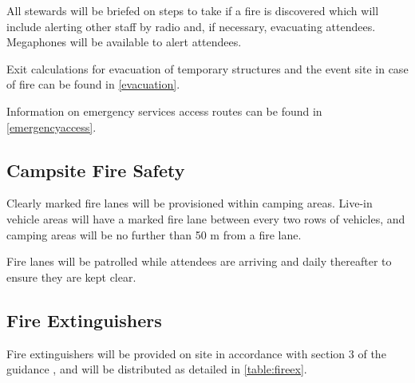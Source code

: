 All stewards will be briefed on steps to take if a fire is discovered which
will include alerting other staff by radio and, if necessary, evacuating
attendees. Megaphones will be available to alert attendees.

Exit calculations for evacuation of temporary structures and the event site in case of
fire can be found in \cref{evacuation}.

Information on emergency services access routes can be found in \cref{emergencyaccess}.

\subsection{Campsite Fire Safety}

Clearly marked fire lanes will be provisioned within camping areas. Live-in vehicle areas will
have a marked fire lane between every two rows of vehicles, and camping areas will be no further
than 50 m from a fire lane.

Fire lanes will be patrolled while attendees are arriving and daily thereafter to ensure they are
kept clear.

\subsection{Fire Extinguishers}
\label{fire-extinguishers}

Fire extinguishers will be provided on site in accordance with section 3 of the
guidance \cite{firesafety}, and will be distributed as detailed in \cref{table:fireex}.

